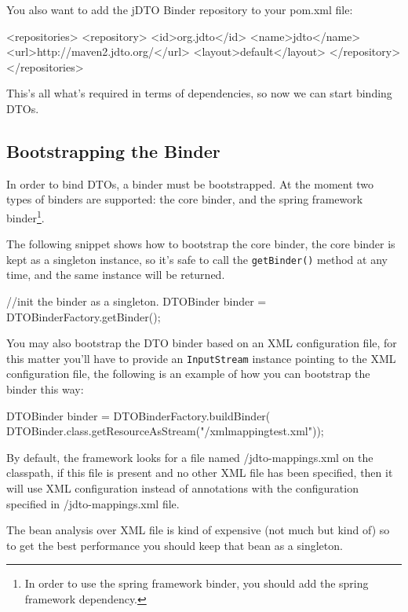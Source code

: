 \documentclass[11pt]{article}
\newcommand{\JDTO}{jDTO Binder\xspace}
\newcommand{\DEFAULTCONFIG}{/jdto-mappings.xml\xspace}
\begin{document}
You also want to add the \JDTO repository to your pom.xml file:

\begin{xml}
     <repositories>
        <repository>
            <id>org.jdto</id>
            <name>jdto</name>
            <url>http://maven2.jdto.org/</url>
            <layout>default</layout>
        </repository>
    </repositories>
\end{xml}

This's all what's required in terms of dependencies, so now we can start binding DTOs.

\subsection{Bootstrapping the Binder}


In order to bind DTOs, a binder must be bootstrapped. At the moment two types of binders
are supported: the core binder, and the spring framework binder\footnote{In order to use the spring framework binder, you should add the spring framework dependency.}.


The following snippet shows how to bootstrap the core binder, the core binder is kept as a singleton instance, so it's safe to call the \texttt{getBinder()} method at any time, and the same instance will be returned.


\begin{java}
//init the binder as a singleton.
DTOBinder binder = DTOBinderFactory.getBinder();
\end{java}

You may also bootstrap the DTO binder based on an XML configuration file, for this matter you'll have to provide an \texttt{InputStream} instance pointing to the XML configuration file, the following is an example of how you can bootstrap the binder this way:


\begin{java}
DTOBinder binder = DTOBinderFactory.buildBinder(
    DTOBinder.class.getResourceAsStream("/xmlmappingtest.xml"));
\end{java}

By default, the framework looks for a file named \DEFAULTCONFIG on the classpath, if this file is present and no other XML file has been specified, then it will use XML configuration instead of annotations with the configuration specified in \DEFAULTCONFIG file.

The bean analysis over XML file is kind of expensive (not much but kind of) so to get the best performance you should keep that bean as a singleton.
\end{document}
